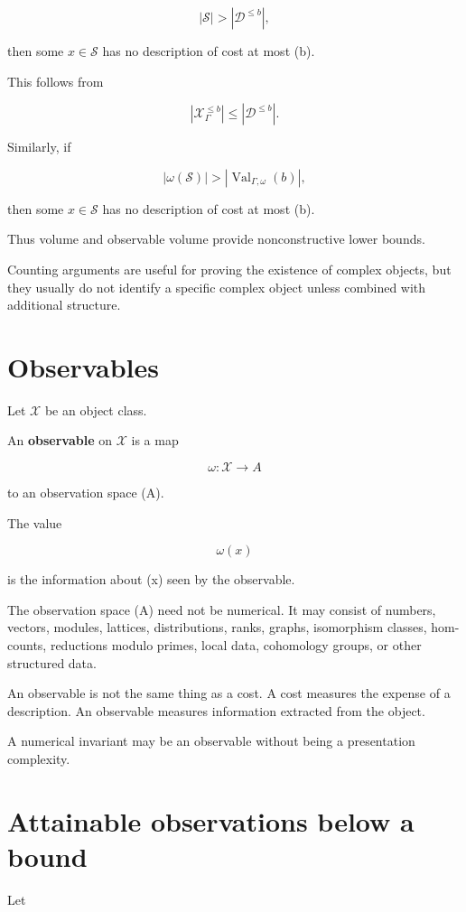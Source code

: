 \documentclass[11pt]{article}
\begin{document}
\[
|\mathcal S|>|\mathcal D^{\leq b}|,
\]

then some \(x\in\mathcal S\) has no description of cost at most (b).

This follows from

\[
|\mathcal X_\Gamma^{\leq b}|
\leq
|\mathcal D^{\leq b}|.
\]

Similarly, if

\[
|\omega(\mathcal S)|>|\operatorname{Val}_{\Gamma,\omega}(b)|,
\]

then some \(x\in\mathcal S\) has no description of cost at most (b).

Thus volume and observable volume provide nonconstructive lower bounds.

Counting arguments are useful for proving the existence of complex objects, but they usually do not identify a specific complex object unless combined with additional structure.


\section{Observables}

Let \(\mathcal X\) be an object class.

An \textbf{observable} on \(\mathcal X\) is a map

\[
\omega:\mathcal X\to A
\]

to an observation space (A).

The value

\[
\omega(x)
\]

is the information about (x) seen by the observable.

The observation space (A) need not be numerical. It may consist of numbers, vectors, modules, lattices, distributions, ranks, graphs, isomorphism classes, hom-counts, reductions modulo primes, local data, cohomology groups, or other structured data.

An observable is not the same thing as a cost. A cost measures the expense of a description. An observable measures information extracted from the object.

A numerical invariant may be an observable without being a presentation complexity.


\section{Attainable observations below a bound}

Let
\end{document}

